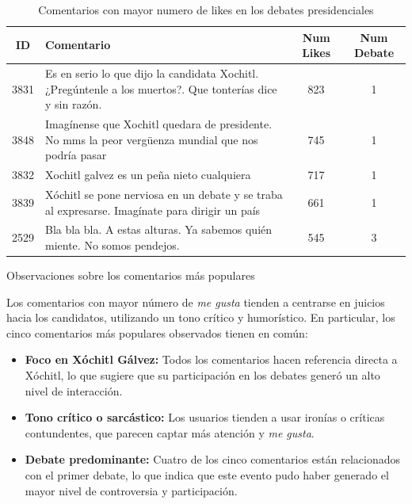 \documentclass[10pt, a4paper]{article}
\begin{document}
	\begin{table}[H]
		\centering
		\begin{tabular}{|c|p{11cm}|c|c|}
			\hline
			\textbf{ID} & \textbf{Comentario} & \textbf{Num Likes} & \textbf{Num Debate} \\ \hline
			3831 & Es en serio lo que dijo la candidata Xochitl. ¿Pregúntenle a los muertos?. Que tonterías dice y sin razón. & 823 & 1 \\ \hline
			3848 & Imagínense que Xochitl quedara de presidente. No mms la peor vergüenza mundial que nos podría pasar & 745 & 1 \\ \hline
			3832 & Xochitl galvez es un peña nieto cualquiera & 717 & 1 \\ \hline
			3839 & Xóchitl se pone nerviosa en un debate y se traba al expresarse. Imagínate para dirigir un país & 661 & 1 \\ \hline
			2529 & Bla bla bla. A estas alturas. Ya sabemos quién miente. No somos pendejos. & 545 & 3 \\ \hline
		\end{tabular}
		\caption{Comentarios con mayor numero de likes en los debates presidenciales}
		\label{tab:comentarios_xochitl}
	\end{table}

	
	Observaciones sobre los comentarios más populares
	
	Los comentarios con mayor número de \textit{me gusta} tienden a centrarse en juicios hacia los candidatos, utilizando un tono crítico y humorístico. En particular, los cinco comentarios más populares observados tienen en común:
	
	\begin{itemize}
		\item \textbf{Foco en Xóchitl Gálvez:} Todos los comentarios hacen referencia directa a Xóchitl, lo que sugiere que su participación en los debates generó un alto nivel de interacción.
		\item \textbf{Tono crítico o sarcástico:} Los usuarios tienden a usar ironías o críticas contundentes, que parecen captar más atención y \textit{me gusta}.
		\item \textbf{Debate predominante:} Cuatro de los cinco comentarios están relacionados con el primer debate, lo que indica que este evento pudo haber generado el mayor nivel de controversia y participación.
	\end{itemize}
	
	
\end{document}
